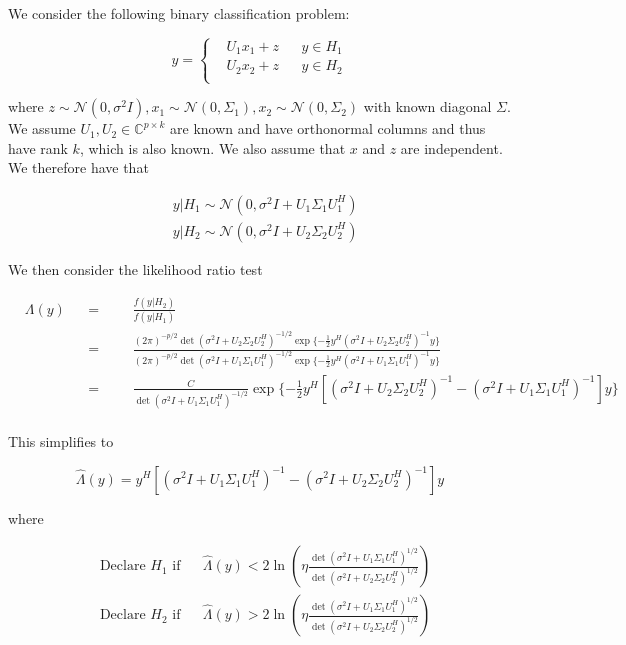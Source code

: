 \documentclass[english]{article}
\begin{document}
We consider the following binary classification problem:

\begin{equation}
y=\left\{
\begin{aligned}
&U_1x_1+z
&& y\in H_1\\
&U_2x_2+z
&& y\in H_2\\
\end{aligned}\right.
\end{equation}

where $z\sim\mathcal{N}(0,\sigma^2I), x_1\sim\mathcal{N}(0,\Sigma_1),x_2\sim\mathcal{N}(0,\Sigma_2)$ with known diagonal $\Sigma$. We assume $U_1,U_2\in\mathbb{C}^{p\times k}$ are known and have orthonormal columns and thus have rank $k$, which is also known. We also assume that $x$ and $z$ are independent. We therefore have that

\begin{equation}
\begin{aligned}
&y|H_1\sim\mathcal{N}(0,\sigma^2I+U_1\Sigma_1U_1^H)\\
&y|H_2\sim\mathcal{N}(0,\sigma^2I+U_2\Sigma_2U_2^H)
\end{aligned}
\end{equation}

We then consider the likelihood ratio test

\begin{equation}
\begin{aligned}
&\Lambda(y)
&&=
&&&\frac{f(y|H_2)}{f(y|H_1)}\\
&&&=
&&&\frac{(2\pi)^{-p/2}\det(\sigma^2I+U_2\Sigma_2U_2^H)^{-1/2}\exp\{-\frac{1}{2}y^H(\sigma^2I+U_2\Sigma_2U_2^H)^{-1}y\}}{(2\pi)^{-p/2}\det(\sigma^2I+U_1\Sigma_1U_1^H)^{-1/2}\exp\{-\frac{1}{2}y^H(\sigma^2I+U_1\Sigma_1U_1^H)^{-1}y\}}\\
&&&=
&&&\frac{C}{\det(\sigma^2I+U_1\Sigma_1U_1^H)^{-1/2}}\exp\{-\frac{1}{2}y^H\left[(\sigma^2I+U_2\Sigma_2U_2^H)^{-1} - (\sigma^2I+U_1\Sigma_1U_1^H)^{-1}\right]y\}\\
\end{aligned}
\end{equation}

This simplifies to

\begin{equation}\label{eq:stoch LRT1}
\hat{\Lambda}(y)=y^H\left[(\sigma^2I+U_1\Sigma_1U_1^H)^{-1} - (\sigma^2I+U_2\Sigma_2U_2^H)^{-1}\right]y
\end{equation}

where

\begin{equation}\label{eq:LRT rule1}
\begin{aligned}
&\text{Declare } H_1 \text{ if}
&& \hat{\Lambda}(y) < 2\ln\left(\eta\frac{\det(\sigma^2I+U_1\Sigma_1U_1^H)^{1/2}}{\det(\sigma^2I+U_2\Sigma_2U_2^H)^{1/2}}\right)\\
& \text{Declare } H_2 \text{ if}
&& \hat{\Lambda}(y) > 2\ln\left(\eta\frac{\det(\sigma^2I+U_1\Sigma_1U_1^H)^{1/2}}{\det(\sigma^2I+U_2\Sigma_2U_2^H)^{1/2}}\right)\\
\end{aligned}
\end{equation}
\end{document}
